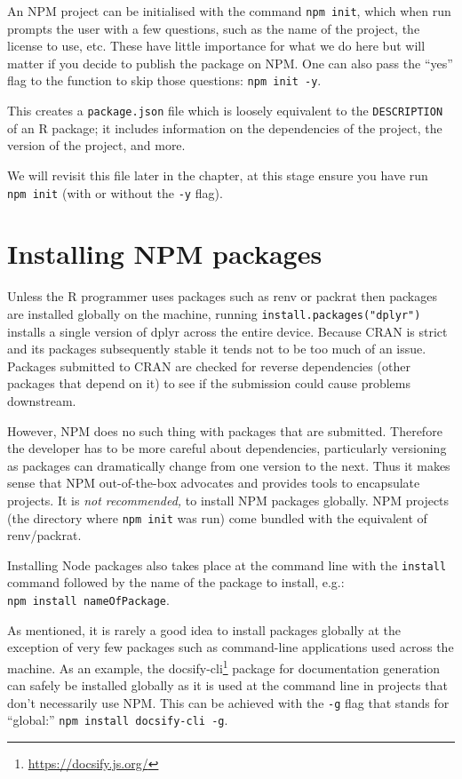 \documentclass[
]{krantz}
\renewcommand{\href}[2]{#2\footnote{\url{#1}}}
\begin{document}
An NPM project can be initialised with the command \texttt{npm\ init}, which when run prompts the user with a few questions, such as the name of the project, the license to use, etc. These have little importance for what we do here but will matter if you decide to publish the package on NPM. One can also pass the ``yes'' flag to the function to skip those questions: \texttt{npm\ init\ -y}.

This creates a \texttt{package.json} file which is loosely equivalent to the \texttt{DESCRIPTION} of an R package; it includes information on the dependencies of the project, the version of the project, and more.

We will revisit this file later in the chapter, at this stage ensure you have run \texttt{npm\ init} (with or without the \texttt{-y} flag).

\hypertarget{webpack-intro-install-pkgs}{%
\section{Installing NPM packages}\label{webpack-intro-install-pkgs}}

Unless the R programmer uses packages such as renv \citep{R-renv} or packrat \citep{R-packrat} then packages are installed globally on the machine, running \texttt{install.packages("dplyr")} installs a single version of dplyr across the entire device. Because CRAN is strict and its packages subsequently stable it tends not to be too much of an issue. Packages submitted to CRAN are checked for reverse dependencies (other packages that depend on it) to see if the submission could cause problems downstream.

However, NPM does no such thing with packages that are submitted. Therefore the developer has to be more careful about dependencies, particularly versioning as packages can dramatically change from one version to the next. Thus it makes sense that NPM out-of-the-box advocates and provides tools to encapsulate projects. It is \emph{not recommended,} to install NPM packages globally. NPM projects (the directory where \texttt{npm\ init} was run) come bundled with the equivalent of renv/packrat.

Installing Node packages also takes place at the command line with the \texttt{install} command followed by the name of the package to install, e.g.: \texttt{npm\ install\ nameOfPackage}.

As mentioned, it is rarely a good idea to install packages globally at the exception of very few packages such as command-line applications used across the machine. As an example, the \href{https://docsify.js.org/}{docsify-cli} package for documentation generation can safely be installed globally as it is used at the command line in projects that don't necessarily use NPM. This can be achieved with the \texttt{-g} flag that stands for ``global:'' \texttt{npm\ install\ docsify-cli\ -g}.
\end{document}
